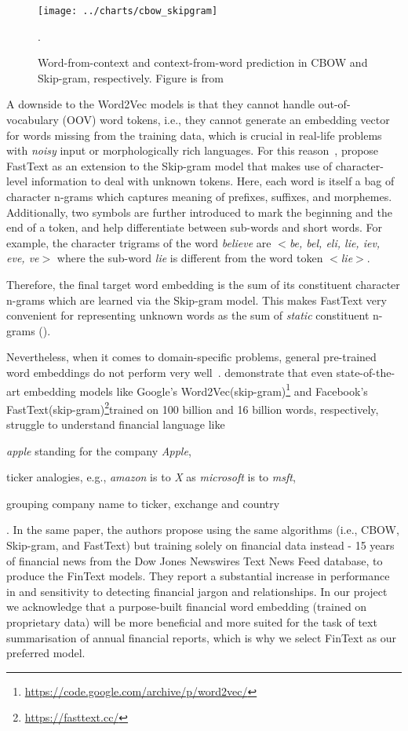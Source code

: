 \begin{figure}[ht]
    \centering
    \texttt{[image: ../charts/cbow\_skipgram]}
    \caption{Word-from-context and context-from-word prediction in CBOW and Skip-gram, respectively. Figure is from~\cite{mikolov2013efficient}}.
    \label{fig:cbow_skipgram}
\end{figure}

A downside to the Word2Vec models is that they cannot handle out-of-vocabulary (OOV) word tokens, i.e., they cannot generate an embedding vector for words missing from the training data, which is crucial in real-life problems with \emph{noisy} input or morphologically rich languages.
For this reason~\cite{bojanowski-etal-2017-enriching}, propose FastText as an extension to the Skip-gram model that makes use of character-level information to deal with unknown tokens.
Here, each word is itself a bag of character n-grams which captures meaning of prefixes, suffixes, and morphemes. 
Additionally, two symbols are further introduced to mark the beginning and the end of a token, and help differentiate between sub-words and short words.
For example, the character trigrams of the word \emph{believe} are \emph{$<$be, bel, eli, lie, iev, eve, ve$>$} where the sub-word \emph{lie} is different from the word token \emph{$<$lie$>$}.

Therefore, the final target word embedding is the sum of its constituent character n-grams which are learned via the Skip-gram model.
This makes FastText very convenient for representing unknown words as the sum of \emph{static} constituent n-grams (\cite{jurafsky2000}).

Nevertheless, when it comes to domain-specific problems, general pre-trained word embeddings do not perform very well~\cite{rahimikia2021realised}.
demonstrate that even state-of-the-art embedding models like Google's Word2Vec(skip-gram)\footnote{\url{https://code.google.com/archive/p/word2vec/}} and Facebook’s FastText(skip-gram)\footnote{\url{https://fasttext.cc/}}trained on 100 billion and 16 billion words, respectively, struggle to understand financial language like \begin{enumerate*}
    \item \emph{apple} standing for the company \emph{Apple},
    \item ticker analogies, e.g., \emph{amazon} is to \emph{X} as \emph{microsoft} is to \emph{msft},
    \item grouping company name to ticker, exchange and country
\end{enumerate*}.
In the same paper, the authors propose using the same algorithms (i.e., CBOW, Skip-gram, and FastText) but training solely on financial data instead - 15 years of financial news from the Dow Jones Newswires Text News Feed database, to produce the FinText models.
They report a substantial increase in performance in and sensitivity to detecting financial jargon and relationships.
In our project we acknowledge that a purpose-built financial word embedding (trained on proprietary data) will be more beneficial and more suited for the task of text summarisation of annual financial reports, which is why we select FinText as our preferred model.

